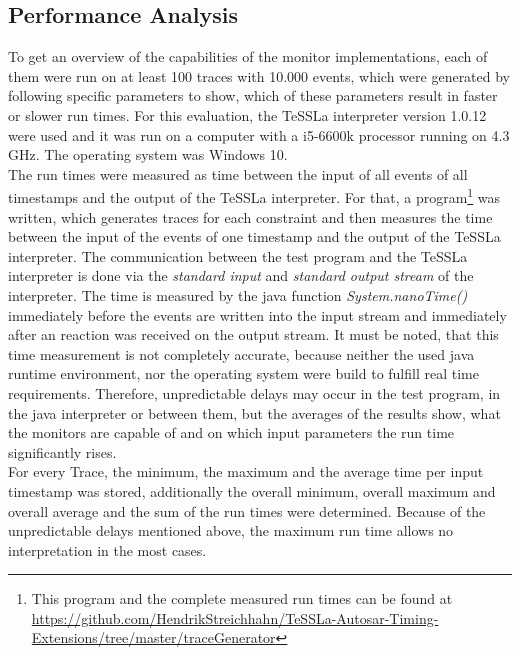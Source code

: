 \subsection{Performance Analysis}
\label{sec:performance}
To get an overview of the capabilities of the monitor implementations, each of them were run on at least 100 traces with 10.000 events, which were generated by following specific parameters to show, which of these parameters result in faster or slower run times. For this evaluation, the TeSSLa interpreter version 1.0.12 were used and it was run on a computer with a i5-6600k processor running on 4.3 GHz. The operating system was Windows 10.\\ %
The run times were measured as time between the input of all events of all timestamps and the output of the TeSSLa interpreter. For that, a program\footnote{This program and the complete measured run times can be found at \href{https://github.com/HendrikStreichhahn/TeSSLa-Autosar-Timing-Extensions/tree/master/traceGenerator}{https://github.com/HendrikStreichhahn/TeSSLa-Autosar-Timing-Extensions/tree/master/traceGenerator}} was written, which generates traces for each constraint and then measures the time between the input of the events of one timestamp and the output of the TeSSLa interpreter. The communication between the test program and the TeSSLa interpreter is done via the \textit{standard input} and \textit{standard output stream} of the interpreter. The time is measured by the java function \textit{System.nanoTime()} immediately before the events are written into the input stream and immediately after an reaction was received on the output stream. It must be noted, that this time measurement is not completely accurate, because neither the used java runtime environment, nor the operating system were build to fulfill real time requirements. Therefore, unpredictable delays may occur in the test program, in the java interpreter or between them, but the averages of the results show, what the monitors are capable of and on which input parameters the run time significantly rises.\\
For every Trace, the minimum, the maximum and the average time per input timestamp was stored, additionally the overall minimum, overall maximum and overall average and the sum of the run times were determined. Because of the unpredictable delays mentioned above, the maximum run time allows no interpretation in the most cases.


